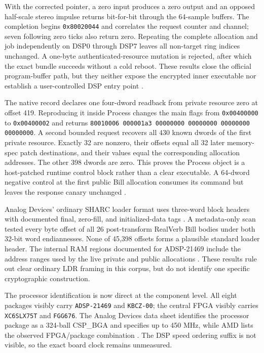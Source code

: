 \documentclass[10pt,twocolumn,twoside]{article}
\begin{document}
With the corrected pointer, a zero input produces a zero output and an opposed
half-scale stereo impulse returns bit-for-bit through the 64-sample buffers. The
completion begins \texttt{0x80020044} and correlates the request counter and
channel; seven following zero ticks also return zero. Repeating the complete
allocation and job independently on DSP0 through DSP7 leaves all non-target
ring indices unchanged. A one-byte authenticated-resource mutation is rejected,
after which the exact bundle succeeds without a cold reboot. These results close
the official program-buffer path, but they neither expose the encrypted inner
executable nor establish a user-controlled DSP entry point \cite{uad-project}.

The native record declares one four-dword readback from private resource zero
at offset 419. Reproducing it inside Process changes the main flags from
\texttt{0x00400000} to \texttt{0x00400002} and returns
\texttt{80010006 000001a3 00000000 00000000 00000000 00000000}. A second
bounded request recovers all 430 known dwords of the first private resource.
Exactly 32 are nonzero, their offsets equal all 32 later memory-spec patch
destinations, and their values equal the corresponding allocation addresses.
The other 398 dwords are zero. This proves the Process object is a host-patched
runtime control block rather than a clear executable. A 64-dword negative
control at the first public Bill allocation consumes its command but leaves the
response canary unchanged \cite{uad-project}.

Analog Devices' ordinary SHARC loader format uses three-word block headers with
documented final, zero-fill, and initialized-data tags
\cite{adi-cces-loader}. A metadata-only scan tested every byte offset of all 26
post-transform RealVerb Bill bodies under both 32-bit word endiannesses. None
of 45,398 offsets forms a plausible standard loader header. The internal RAM
regions documented for ADSP-21469 include the address ranges used by the live
private and public allocations \cite{adi-adsp21469-ezboard}. These results rule
out clear ordinary LDR framing in this corpus, but do not identify one specific
cryptographic construction.

The processor identification is now direct at the component level. All eight
packages visibly carry \texttt{ADSP-21469} and \texttt{KBCZ-00}; the central
FPGA visibly carries \texttt{XC6SLX75T} and \texttt{FGG676}. The Analog Devices
data sheet identifies the processor package as a 324-ball CSP\_BGA and specifies
up to 450 MHz, while AMD lists the observed FPGA/package combination
\cite{adi-adsp21469,amd-spartan6-packaging}. The DSP speed ordering suffix is
not visible, so the exact board clock remains unmeasured.
\end{document}
